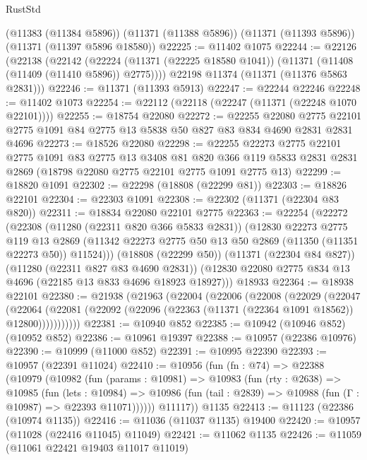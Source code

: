 \begin{lexlean}{RustStd}
\begin{coremodule}
    (@11383 (@11384 @5896))
    (@11371 (@11388 @5896))
    (@11371 (@11393 @5896))
    (@11371 (@11397 @5896 @18580))
@22225 := @11402 @1075
@22244 := @22126
    (@22138
      (@22142
        (@22224 (@11371 (@22225 @18580 @1041)) (@11371 (@11408 (@11409 (@11410 @5896)) @2775))))
      @22198
      @11374
      (@11371 (@11376 @5863 @2831)))
@22246 := @11371 (@11393 @5913)
@22247 := @22244 @22246
@22248 := @11402 @1073
@22254 := @22112 (@22118 (@22247 (@11371 (@22248 @1070 @22101))))
@22255 := @18754 @22080
@22272 := @22255
    @22080
    @2775
    @22101
    @2775
    @1091
    @84
    @2775
    @13
    @5838
    @50
    @827
    @83
    @834
    @4690
    @2831
    @2831
    @4696
@22273 := @18526 @22080
@22298 := @22255
    @22273
    @2775
    @22101
    @2775
    @1091
    @83
    @2775
    @13
    @3408
    @81
    @820
    @366
    @119
    @5833
    @2831
    @2831
    @2869
    (@18798 @22080 @2775 @22101 @2775 @1091 @2775 @13)
@22299 := @18820 @1091
@22302 := @22298 (@18808 (@22299 @81))
@22303 := @18826 @22101
@22304 := @22303 @1091
@22308 := @22302 (@11371 (@22304 @83 @820))
@22311 := @18834 @22080 @22101 @2775
@22363 := @22254
    (@22272
      (@22308
        (@11280 (@22311 @820 @366 @5833 @2831))
        (@12830
          @22273
          @2775
          @119
          @13
          @2869
          (@11342 @22273 @2775 @50 @13 @50 @2869 (@11350 (@11351 @22273 @50)) @11524)))
      (@18808 (@22299 @50))
      (@11371 (@22304 @84 @827))
      (@11280 (@22311 @827 @83 @4690 @2831))
      (@12830 @22080 @2775 @834 @13 @4696 (@22185 @13 @833 @4696 @18923 @18927)))
    @18933
@22364 := @18938 @22101
@22380 := @21938
    (@21963
      (@22004
        (@22006
          (@22008
            (@22029
              (@22047
                (@22064
                  (@22081 (@22092 (@22096 (@22363 (@11371 (@22364 @1091 @18562)) @12800)))))))))))
@22381 := @10940 @852
@22385 := @10942 (@10946 @852) (@10952 @852)
@22386 := @10961 @19397
@22388 := @10957 (@22386 @10976)
@22390 := @10999 (@11000 @852)
@22391 := @10995 @22390
@22393 := @10957 (@22391 @11024)
@22410 := @10956
    (fun (fn : @74) =>
    @22388
      (@10979
        (@10982
          (fun (params : @10981) =>
          @10983
            (fun (rty : @2638) =>
            @10985
              (fun (lets : @10984) =>
              @10986 (fun (tail : @2839) => @10988 (fun (Γ : @10987) => @22393 @11071))))))
        @11117))
    @1135
@22413 := @11123 (@22386 (@10974 @1135))
@22416 := @11036 (@11037 @1135) @19400
@22420 := @10957 (@11028 (@22416 @11045) @11049)
@22421 := @11062 @1135
@22426 := @11059 (@11061 @22421 @19403 @11017 @11019)

\end{coremodule}
\end{lexlean}
